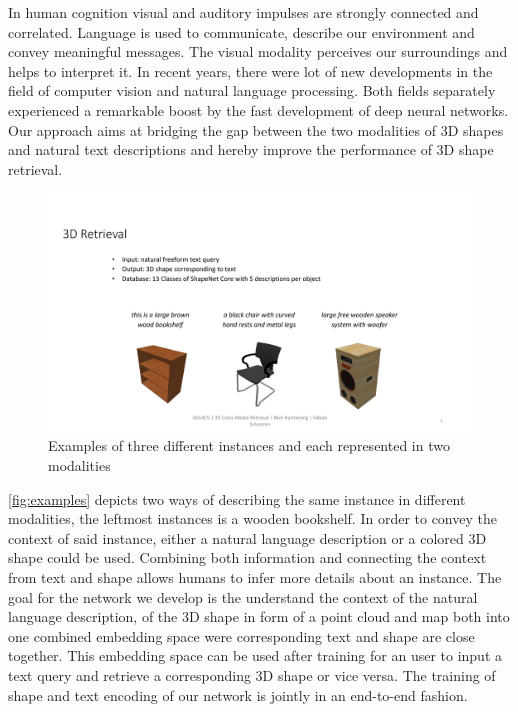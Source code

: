 \documentclass[10pt,twocolumn,letterpaper]{article}
\begin{document}
In human cognition visual and auditory impulses are strongly connected and correlated. Language is used to communicate, describe our environment and convey meaningful messages. The visual modality perceives our surroundings and helps to interpret it. In recent years, there were lot of new developments in the field of computer vision and natural language processing. Both fields separately experienced a remarkable boost by the fast development of deep neural networks. Our approach aims at bridging the gap between the two modalities of 3D shapes and natural text descriptions and hereby improve the performance of 3D shape retrieval.
\begin{figure}[h]%
	\centering
	\includegraphics[width=0.8\linewidth]{fig1.pdf}
	\caption[]{Examples of three different instances and each represented in two modalities}
	\label{fig:examples}
\end{figure}
\autoref{fig:examples} depicts two ways of describing the same instance in different modalities, \eg the leftmost instances is a wooden bookshelf. In order to convey the context of said instance, either a natural language description or a colored 3D shape could be used. Combining both information and connecting the context from text and shape allows humans to infer more details about an instance. The goal for the network we develop is the understand the context of the natural language description, of the 3D shape in form of a point cloud and map both into one combined embedding space were corresponding text and shape are close together. This embedding space can be used after training for an user to input a text query and retrieve a corresponding 3D shape or vice versa. The training of shape and text encoding of our network is jointly in an end-to-end fashion. 
\end{document}
